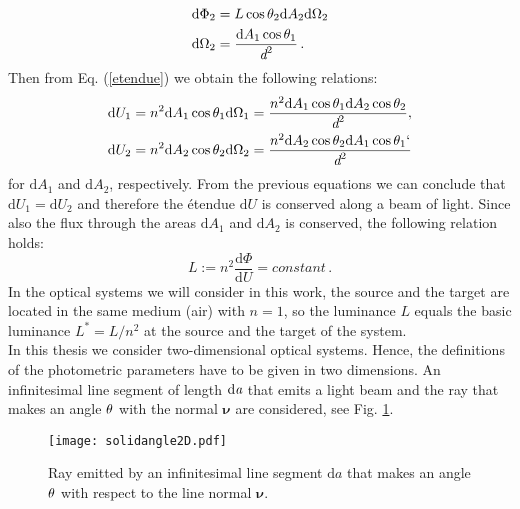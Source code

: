 \begin{equation}\begin{split}
\textrm{d}\Phi_2 &= L \cos\theta_2 \textrm{d}A_2 \textrm{d}\Omega_2\\
\textrm{d}\Omega_2 &= \frac{\textrm{d}A_1\cos\theta_1}{\textit{d}^2}\,.
\end{split}
\end{equation}
Then from Eq. (\ref{etendue}) we obtain the following relations: \begin{equation}
\begin{split}
\textrm{d}U_1 &= n^2 \textrm{d}A_1\cos\theta_1\textrm{d}\Omega_1= \frac{n^2 \textrm{d}A_1\cos\theta_1\textrm{d}A_2\cos\theta_2}{\textit{d}^2},\\
\textrm{d}U_2 &= n^2 \textrm{d}A_2\cos\theta_2\textrm{d}\Omega_2= \frac{ n^2 \textrm{d}A_2\cos\theta_2\textrm{d}A_1\cos\theta_1	`}{\textit{d}^2}
\end{split}
\end{equation}
for $\textrm{d}A_1$ and $\textrm{d}A_2$, respectively.
From the previous equations we can conclude that $\textrm{d}U_1=\textrm{d}U_2$ and therefore the \'{e}tendue $\textrm{d}U$ is conserved along a beam of light. 
Since also the flux through the areas $\textrm{d}A_1$ and $\textrm{d}A_2$ is conserved, the following relation holds:
\begin{equation}\label{basicluminance}
L := n^2 \frac{\textrm{d}\Phi}{\textrm{d}U} = constant\,.
\end{equation}
 In the optical systems we will consider in this work, the source and the target are located in the same medium (air) with $n=1$, so the luminance $L$ equals the basic luminance $L^* = L/n^2$ at the source and the target of the system.\\
\indent In this thesis we consider two-dimensional optical systems. 
 Hence, the definitions of the photometric parameters have to be given in two dimensions. An infinitesimal line segment of length $\textrm{d}\textit{a}$ that emits a light beam and the ray that makes an angle $\theta$ with the normal $\boldsymbol{\nu}$ are considered, see Fig. \ref{fig:2Dsolidangle}. 

\begin{figure}[h]
 \label{fig:2Dsolidangle}
     \begin{center}
     \texttt{[image: solidangle2D.pdf]}
     \end{center}
     \caption{Ray emitted by an infinitesimal line segment $\textrm{d}a$ that makes an angle $\theta$ with respect to the line normal $\boldsymbol{\nu}$.}
\label{fig:2Dsolidangle}
 \end{figure}

